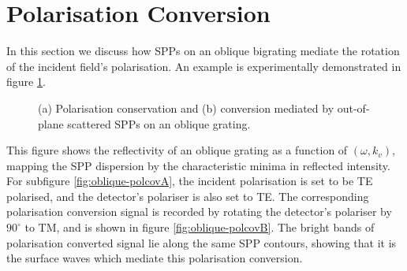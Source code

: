 \section{Polarisation Conversion}

In this section we discuss how SPPs on an oblique bigrating mediate the rotation of the incident field's polarisation. An example is experimentally demonstrated in figure \ref{fig:oblique-polcov}.

\begin{figure}
\begin{center}
\end{center}
\caption[Polarisation conservation and conversion mediated by out-of-plane scattered SPPs on an oblique grating.]{(a) Polarisation conservation and (b) conversion mediated by out-of-plane scattered SPPs on an oblique grating.\label{fig:oblique-polcov}}
\end{figure}

This figure shows the reflectivity of an oblique grating as a function of $(\omega,k_v)$, mapping the SPP dispersion by the characteristic minima in reflected intensity.  For subfigure \ref{fig:oblique-polcovA}, the incident polarisation is set to be TE polarised, and the detector's polariser is also set to TE. The corresponding polarisation conversion signal is recorded by rotating the detector's polariser by $90^\circ$ to TM, and is shown in figure \ref{fig:oblique-polcovB}. The bright bands of polarisation converted signal lie along the same SPP contours, showing that it is the surface waves which mediate this polarisation conversion.

